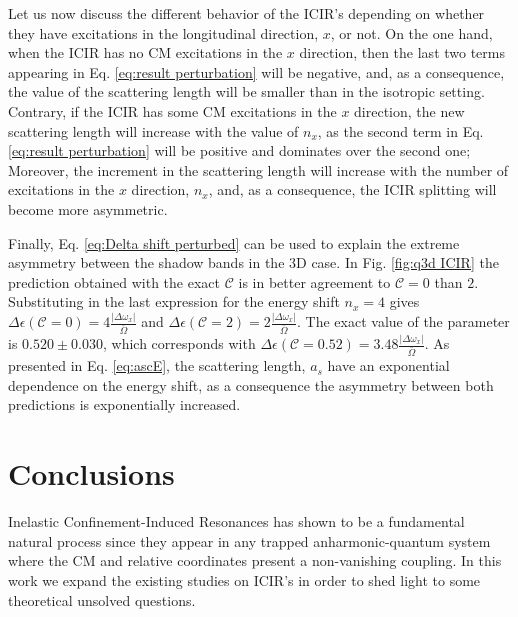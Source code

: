 \documentclass[aps,pre,twocolumn,superscriptaddress,showpacs]{revtex4-1}
\begin{document}
Let us now discuss the different behavior of the ICIR's depending on whether they have excitations in the longitudinal direction, $x$, or not. On the one hand, when the ICIR has no CM excitations in the $x$ direction, then the last two terms appearing in Eq. \ref{eq:result perturbation} will be negative, and, as a consequence, the value of the scattering length will be smaller than in the isotropic setting. Contrary, if the ICIR has some CM excitations in the $x$ direction, the new scattering length will increase with the value of $n_x$, as the second term in Eq. \ref{eq:result perturbation} will be positive and dominates over the second one; Moreover, the increment in the scattering length will increase with the number of excitations in the $x$ direction, $n_x$, and, as a consequence, the ICIR splitting will become more asymmetric.

Finally, Eq. \ref{eq:Delta shift perturbed} can be used to explain the extreme asymmetry between the shadow bands in the 3D case. In Fig. \ref{fig:q3d ICIR} the prediction obtained with the exact $\mathcal{C}$ is in better agreement to $\mathcal{C}=0$ than $2$. Substituting in the last expression for the energy shift $n_x = 4$ gives $\Delta \epsilon(\mathcal{C}=0) = 4\frac{|\Delta \omega_x|}{\bar{\Omega}}$ and $\Delta \epsilon(\mathcal{C}=2) = 2\frac{|\Delta \omega_x|}{\bar{\Omega}}$. The exact value of the parameter is $0.520 \pm 0.030$, which corresponds with $\Delta \epsilon(\mathcal{C}=0.52) = 3.48\frac{|\Delta \omega_x|}{\bar{\Omega}}$. As presented in Eq. \eqref{eq:ascE}, the scattering length, $a_s$ have an exponential dependence on the energy shift, as a consequence the asymmetry between both predictions is exponentially increased.

\section{Conclusions} \label{sec:conclusions}
Inelastic Confinement-Induced Resonances has shown to be a fundamental natural process since they appear in any trapped anharmonic-quantum system where the CM and relative coordinates present a non-vanishing coupling. In this work we expand the existing studies on ICIR's in order to shed light to some theoretical unsolved questions. 
\end{document}
